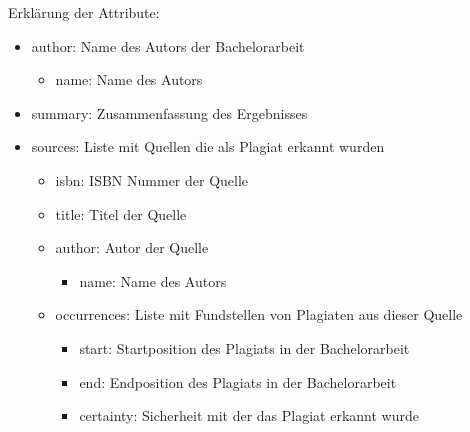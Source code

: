 Erklärung der Attribute:
\begin{itemize}
    \item author: Name des Autors der Bachelorarbeit
    \begin{itemize}
        \item name: Name des Autors
    \end{itemize}
    \item summary: Zusammenfassung des Ergebnisses
    \item sources: Liste mit Quellen die als Plagiat erkannt wurden
    \begin{itemize}
        \item isbn: ISBN Nummer der Quelle
        \item title: Titel der Quelle
        \item author: Autor der Quelle
        \begin{itemize}
            \item name: Name des Autors
        \end{itemize}
        \item occurrences: Liste mit Fundstellen von Plagiaten aus dieser Quelle
        \begin{itemize}
            \item start: Startposition des Plagiats in der Bachelorarbeit
            \item end: Endposition des Plagiats in der Bachelorarbeit
            \item certainty: Sicherheit mit der das Plagiat erkannt wurde
        \end{itemize}
    \end{itemize}
\end{itemize}